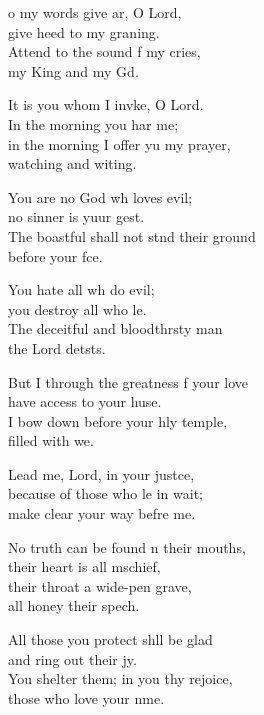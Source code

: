 \settowidth{\versewidth}{you surround him with favour as with a shield.}
\begin{psalmverse}%
  \begin{patverse}
    o my words give ar, O Lord,\Med\\
    give heed to my graning.\\
    Attend to the sound f my cries,\Med\\
    my King and my Gd.

It is you whom I invke, O Lord.\Med\\
    In the morning you har me;\\
in the morning I offer yu my prayer,\Med\\
    watching and witing.

You are no God wh loves evil;\Med\\
    no sinner is yuur gest.\\
The boastful shall not stnd their ground\Med\\
    before your fce.

You hate all wh do evil;\Med\\
    you destroy all who l\pointup{\i}e.\\
The deceitful and bloodth\pointup{\i}rsty man\Med\\
    the Lord detsts.

But I through the greatness f your love\Med\\
    have access to your huse.\\
I bow down before your hly temple,\Med\\
    filled with we.

Lead me, Lord, in your just\pointup{\i}ce,\Flex\\
    because of those who l\pointup{\i}e in wait;\Med\\
    make clear your way befre me.

No truth can be found \pointup{\i}n their mouths,\Med\\
    their heart is all m\pointup{\i}schief,\\
their throat a wide-pen grave,\Med\\
    all honey their spech.

All those you protect shll be glad\Med\\
    and ring out their jy.\\
You shelter them; in you thy rejoice,\Med\\
    those who love your nme.


\end{patverse}
\end{psalmverse}
